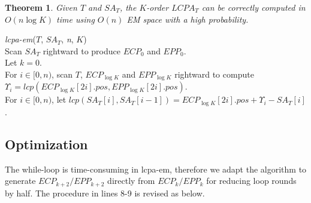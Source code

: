 \documentclass{llncs}
\newtheorem{thm}{Theorem}
\begin{document}
\begin{thm}
\label{thm:lcp:em}
Given $T$ and $SA_T$, the $K$-order $LCPA_T$ can be correctly computed in $O(n \log K)$ time using $O(n)$ {EM} space with a high probability.
\end{thm}

\begin{algorithm}[hbtp!]
\caption{Compute $K$-Order $LCPA_T$ in EM}
\label{fig:alg:em}
{\em lcpa-em}($T$, $SA_T$, {\em n}, $K$){\\
\SetAlgoNoLine
Scan $SA_T$ rightward to produce $ECP_0$ and $EPP_0$.\\
Let $k = 0$. \\
\While{$k < \log K$}{
\Indentp{-1em}
Radix-sort $ECP_k$ and $EPP_k$ by $pos$ to form $IECP_k$ and $IEPP_k$. \\
For $i\in [0,n)$ and $j\in [0,2n)$, scan $T$ rightward to iteratively compute the finger-print of ${\sf pre}(T,i)$ and set $IECP_k[j].fp$ or $IEPP_k[j].fp$ to $FP[0,i]$ if $IECP_k[j].pos = i$ or $IEPP_k[j].pos = i$. \\
Radix-sort $IECP_k$ and $IEPP_k$ to $ECP_k$ and $EPP_k$ by $idx$. \\
For $i \in [0,n)$, scan $ECP_k$ and $EPP_k$ rightward to compute and compare each pair of $(FP[ECP_k[2i].pos+1,ECP_k[2i+1].pos], FP[EPP_k[2i].pos+1,EPP_k[2i+1].pos])$ for generating $ECP_{k+1}$ and $EPP_{k+1}$. \\
Let $k = k + 1$. \\
}
For $i \in [0,n)$, scan $T$, $ECP_{\log K}$ and $EPP_{\log K}$ rightward to compute $\Upsilon_i = lcp(ECP_{\log K}[2i].pos,EPP_{\log K}[2i].pos)$. \\
For $i \in [0,n)$, let $lcp(SA_T[i],SA_T[i-1])=ECP_{\log K}[2i].pos+\Upsilon_i-SA_T[i]$.\\
}
\end{algorithm}

\subsection{Optimization}\label{subsec:optimization}

The while-loop is time-consuming in {lcpa-em}, therefore we adapt the algorithm to generate $ECP_{k+2}/EPP_{k+2}$ directly from $ECP_k/EPP_k$ for reducing loop rounds by half. The procedure in lines 8-9 is revised as below.
\end{document}
